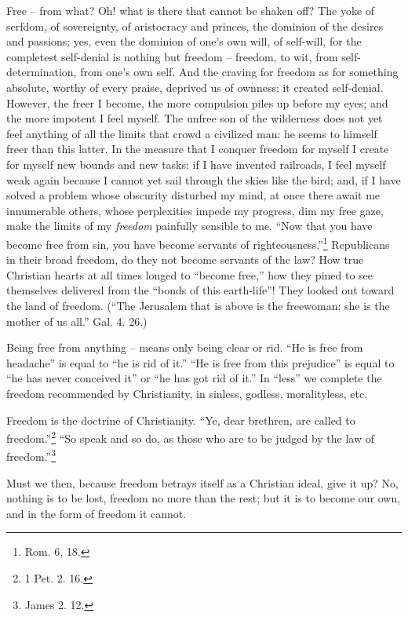 \documentclass[12pt,a4paper]{book}
\begin{document}
Free -- from what? Oh! what is there that cannot be shaken off? The yoke of 
serfdom, of sovereignty, of aristocracy and princes, the dominion of the 
desires and passions; yes, even the dominion of one's own will, of self-will, 
for the completest self-denial is nothing but freedom -- freedom, to wit, from 
self-determination, from one's own self. And the craving for freedom as for 
something absolute, worthy of every praise, deprived us of ownness: it created 
self-denial. However, the freer I become, the more compulsion piles up before 
my eyes; and the more impotent I feel myself. The unfree son of the wilderness 
does not yet feel anything of all the limits that crowd a civilized man: he 
seems to himself freer than this latter. In the measure that I conquer freedom 
for myself I create for myself new bounds and new tasks: if I have invented 
railroads, I feel myself weak again because I cannot yet sail through the 
skies like the bird; and, if I have solved a problem whose obscurity disturbed 
my mind, at once there await me innumerable others, whose perplexities impede 
my progress, dim my free gaze, make the limits of my \textit{freedom} 
painfully sensible to me. ``Now that you have become free from sin, you have 
become servants of righteousness.''\footnote{Rom. 6, 18.} Republicans in 
their broad freedom, do they not become servants of the law? How true 
Christian hearts at all times longed to ``become free,'' how they pined to 
see themselves delivered from the ``bonds of this earth-life''! They looked 
out toward the land of freedom. (``The Jerusalem that is above is the 
freewoman; she is the mother of us all.'' Gal. 4. 26.)

Being free from anything -- means only being clear or rid. ``He is free from 
headache'' is equal to ``he is rid of it.'' ``He is free from this 
prejudice'' is equal to ``he has never conceived it'' or ``he has got rid 
of it.'' In ``less'' we complete the freedom recommended by Christianity, 
in sinless, godless, moralityless, etc.

 Freedom is the doctrine of Christianity. ``Ye, dear brethren, are called to 
freedom.''\footnote{1 Pet. 2. 16.} ``So speak and so do, as those who are to 
be judged by the law of freedom.''\footnote{James 2. 12.}

Must we then, because freedom betrays itself as a Christian ideal, give it up? 
No, nothing is to be lost, freedom no more than the rest; but it is to become 
our own, and in the form of freedom it cannot.
\end{document}
